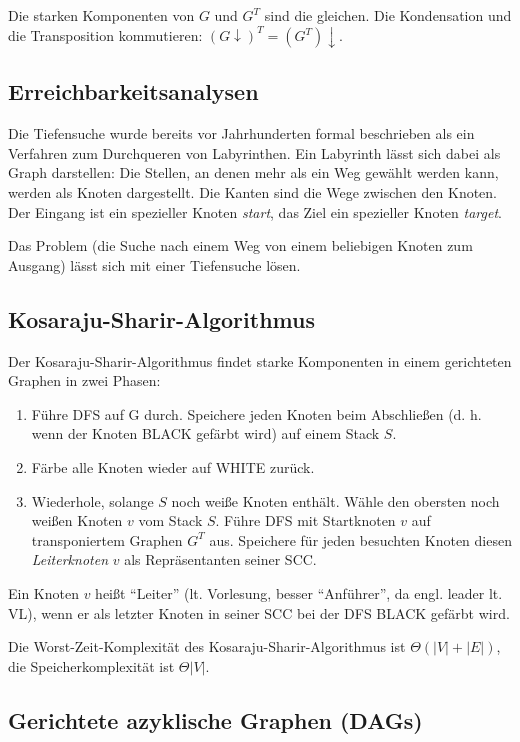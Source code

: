 \documentclass[12pt]{article}
\begin{document}
Die starken Komponenten von $G$ und $G^T$ sind die gleichen. Die Kondensation und die Transposition kommutieren: $(G\downarrow)^T = (G^T)\downarrow$.

\subsection{Erreichbarkeitsanalysen}

Die Tiefensuche wurde bereits vor Jahrhunderten formal beschrieben als ein Verfahren zum Durchqueren von Labyrinthen. Ein Labyrinth lässt sich dabei als Graph darstellen: Die Stellen, an denen mehr als ein Weg gewählt werden kann, werden als Knoten dargestellt. Die Kanten sind die Wege zwischen den Knoten. Der Eingang ist ein spezieller Knoten \textit{start}, das Ziel ein spezieller Knoten \textit{target}.

Das Problem (die Suche nach einem Weg von einem beliebigen Knoten zum Ausgang) lässt sich mit einer Tiefensuche lösen.

\subsection{Kosaraju-Sharir-Algorithmus}

Der Kosaraju-Sharir-Algorithmus findet starke Komponenten in einem gerichteten Graphen in zwei Phasen:

\begin{enumerate}
\item Führe DFS auf G durch. Speichere jeden Knoten beim Abschließen (d. h. wenn der Knoten BLACK gefärbt wird) auf einem Stack $S$.
\item Färbe alle Knoten wieder auf WHITE zurück.
\item Wiederhole, solange $S$ noch weiße Knoten enthält. Wähle den obersten noch weißen Knoten $v$ vom Stack $S$. Führe DFS mit Startknoten $v$ auf transponiertem Graphen $G^T$ aus. Speichere für jeden besuchten Knoten diesen \textit{Leiterknoten} $v$ als Repräsentanten seiner SCC.
\end{enumerate}

Ein Knoten $v$ heißt \enquote{Leiter} (lt. Vorlesung, besser \enquote{Anführer}, da engl. leader lt. VL), wenn er als letzter Knoten in seiner SCC bei der DFS BLACK gefärbt wird.

Die Worst-Zeit-Komplexität des Kosaraju-Sharir-Algorithmus ist $\Theta(|V| + |E|)$, die Speicherkomplexität ist $\Theta{|V|}$.

\subsection{Gerichtete azyklische Graphen (DAGs)}
\end{document}
